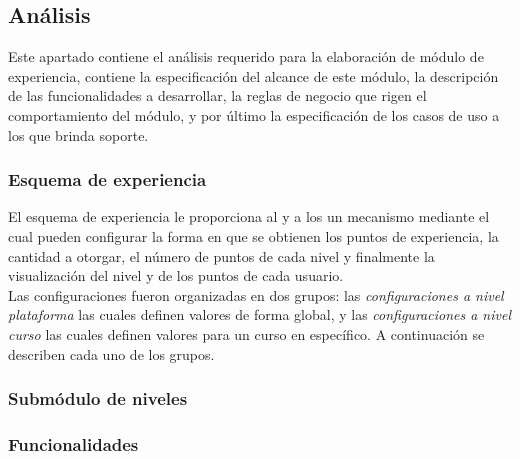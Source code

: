 
\subsection{Análisis}

 Este apartado contiene el análisis requerido para la elaboración de módulo de experiencia,
 contiene la especificación del alcance de este módulo, la descripción de las funcionalidades
 a desarrollar, la reglas de negocio que rigen el comportamiento del módulo, y por último la
 especificación de los casos de uso a los que brinda soporte.

\subsubsection{Esquema de experiencia}

 El esquema de experiencia le proporciona al  y a los  un mecanismo mediante el cual pueden configurar la forma en que se obtienen los puntos
 de experiencia, la cantidad a otorgar, el número de puntos de cada nivel y finalmente la
 visualización del nivel y de los puntos de cada usuario.\\

 \noindent
 Las configuraciones fueron organizadas en dos grupos: las {\it configuraciones a
 nivel plataforma} las cuales definen valores de forma global, y las {\it configuraciones a nivel
 curso} las cuales definen valores para un curso en específico. A continuación se describen cada
 uno de los grupos.\\

\subsubsection{Submódulo de niveles}
\subsubsection{Funcionalidades}



